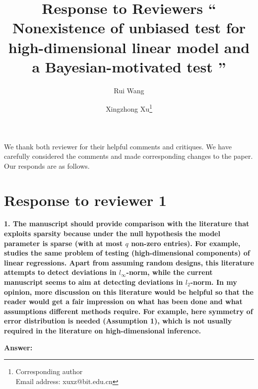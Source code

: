 \documentclass[11pt]{article}
\theoremstyle{plain}
\theoremstyle{definition}
\theoremstyle{remark}
\begin{document}
\title{
Response to Reviewers
``
Nonexistence of unbiased test for high-dimensional linear model and a Bayesian-motivated test 
''
}



\author[1]{Rui Wang}
\author[1,2]{Xingzhong Xu\thanks{Corresponding author\\Email address: xuxz@bit.edu.cn}}

\maketitle

We thank both reviewer for their helpful comments and critiques.
We have carefully considered the comments and made corresponding changes to the paper.
Our responds are as follows.

\section{Response to reviewer 1}

\textbf{
    1.
    The manuscript should provide comparison with the literature that exploits sparsity because under the null hypothesis the model parameter is sparse (with at most $q$ non-zero entries).
    For example, \cite{zhang2016simultaneous} studies the same problem of testing (high-dimensional components) of linear regressions. Apart from assuming random designs, this literature attempts to detect deviations in $l_\infty$-norm, while the current manuscript seems to aim at detecting deviations in
    $l_2$-norm.
    In my opinion, more discussion on this literature would be helpful so that the reader would get a fair impression on what has been done and what assumptions different methods require.
    For example, here symmetry of error distribution is needed (Assumption 1), which is not usually required in the literature on high-dimensional inference.
}

\textbf{Answer:}
\end{document}
